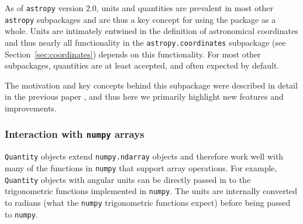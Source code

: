 \documentclass[modern]{aastex61}
\newcommand{\package}[1]{\texttt{#1}\xspace}
\newcommand{\astropypkg}{\package{astropy}}
\newcommand{\sectionname}{Section\xspace}
\newcommand{\inlinecomment}[2]{\todo[inline]{#1: #2}\xspace}
\begin{document}

As of \astropypkg version 2.0, units and quantities are prevalent in most other
\astropypkg subpackages and are thus a key concept for using the package as a
whole.
Units are intimately entwined in the definition of astronomical coordinates and
thus nearly all functionality in the \texttt{astropy.coordinates} subpackage
(see \sectionname~\ref{sec:coordinates}) depends on this functionality.
For most other subpackages, quantities are at least accepted, and often expected
by default.

The motivation and key concepts behind this subpackage were described in detail
in the previous paper \citep{astropy}, and thus here we primarily highlight new
features and improvements.

\subsubsection{Interaction with \package{numpy} arrays}

\texttt{Quantity} objects extend
\texttt{numpy.ndarray} objects and therefore
work well with many of the functions in \texttt{numpy} that support
array operations. For example, \texttt{Quantity} objects with angular
units can be directly passed in to the trigonometric functions implemented in
\texttt{numpy}. The units are internally converted to radians (what the \texttt{numpy}
trigonometric functions expect) before being passed to \texttt{numpy}.

\end{document}
